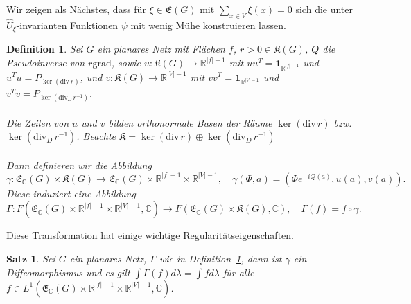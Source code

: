 \documentclass[11pt,a4paper,leqno]{report}
\newtheorem{proposition}{Satz}[chapter]
\newtheorem{definition}[theorem]{Definition}
\numberwithin{equation}{chapter}
\begin{document}
\noindent
Wir zeigen als Nächstes, dass für $\xi\in\mathfrak{E}(G)$ mit $\sum_{x\in V}\xi(x)=0$ sich die unter $\hat{U}_\xi$-invarianten Funktionen $\psi$ mit wenig Mühe konstruieren lassen.
\begin{definition}\label{def:trafo2}
	Sei $G$ ein planares Netz mit Flächen $f$, $r>0\in\mathfrak{K}(G)$, $Q$ die Pseudoinverse von $r\mathrm{grad}$, sowie $u:\mathfrak{K}(G)\to\mathbb{R}^{|f|-1}$ mit $uu^T=\mathbf{1}_{\mathbb{R}^{|f|-1}}$ und $u^Tu=P_{\ker(\mathrm{div}\,r)}$, und $v:\mathfrak{K}(G)\to\mathbb{R}^{|V|-1}$ mit $vv^T=\mathbf{1}_{\mathbb{R}^{|V|-1}}$ und $v^Tv=P_{\ker(\mathrm{div}_D\,r^{-1})}$.
	\\
	\\
	Die Zeilen von $u$ und $v$ bilden orthonormale Basen der Räume $\ker(\mathrm{div}\,r)$ bzw. $\ker(\mathrm{div}_D\,r^{-1})$. Beachte $\mathfrak{K}= \ker(\mathrm{div}\,r)\oplus \ker(\mathrm{div}_D\,r^{-1})$
	\\
	\\
	Dann definieren wir die Abbildung 
	\begin{equation}
	\gamma:\mathfrak{E}_\mathbb{C}(G)\times\mathfrak{K}(G)\to\mathfrak{E}_\mathbb{C}(G)\times\mathbb{R}^{|f|-1}\times\mathbb{R}^{|V|-1}, \quad
	\gamma(\Phi,a)=(\Phi e^{-iQ(a)},u(a),v(a)).
	\end{equation}
	Diese induziert eine Abbildung 
	\begin{equation}
	\Gamma:F(\mathfrak{E}_\mathbb{C}(G)\times\mathbb{R}^{|f|-1}\times\mathbb{R}^{|V|-1},\mathbb{C})\to F(\mathfrak{E}_\mathbb{C}(G)\times\mathfrak{K}(G),\mathbb{C}), \quad \Gamma(f)=f\circ\gamma.
\label{eq:darstell_gamma}
	\end{equation}
\end{definition}
\noindent
Diese Transformation hat einige wichtige Regularitätseigenschaften.
\begin{proposition}\label{thm: integral_invar}
	Sei $G$ ein planares Netz, $\Gamma$ wie in Definition~\ref{def:trafo2}, dann ist $\gamma$ ein Diffeomorphismus und es gilt $\int \Gamma(f)d\lambda = \int f d\lambda$ für alle $f \in L^1(\mathfrak{E}_\mathbb{C}(G)\times\mathbb{R}^{|f|-1}\times\mathbb{R}^{|V|-1},\mathbb{C})$.
\end{proposition}
\end{document}
